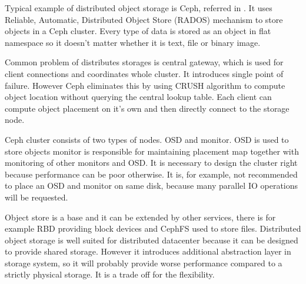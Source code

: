 Typical example of distributed object storage is Ceph, referred in \cite{ceph}. It uses Reliable, Automatic, Distributed Object Store (\Ac{RADOS}) mechanism to store objects in a Ceph cluster. Every type of data is stored as an object in flat namespace so it doesn't matter whether it is text, file or binary image. 

Common problem of distributes storages is central gateway, which is used for client connections and coordinates whole cluster. It introduces single point of failure. However Ceph eliminates this by using \Ac{CRUSH} algorithm to compute object location without querying the central lookup table. Each client can compute object placement on it's own and then directly connect to the storage node.

Ceph cluster consists of two types of nodes. \Ac{OSD} and monitor. \Ac{OSD} is used to store objects  monitor is responsible for maintaining placement map together with monitoring of other monitors and \Ac{OSD}. It is necessary to design the cluster right because performance can be poor otherwise. It is, for example, not recommended to place an \Ac{OSD} and monitor on same disk, because many parallel \Ac{IO} operations will be requested.

Object store is a base and it can be extended by other services, there is for example \Ac{RBD} providing block devices and CephFS used to store files. Distributed object storage is well suited for distributed datacenter because it can be designed to provide shared storage. However it introduces additional abstraction layer in storage system, so it will probably provide worse performance compared to a strictly physical storage. It is a trade off for the flexibility.
